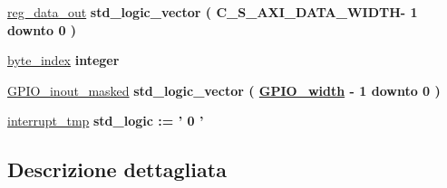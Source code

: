 \begin{DoxyCompactItemize}
\item 
\hypertarget{group___a_x_i-internal_gaa3772389d05ea4ed4ef3659c59ecc979}{\hyperlink{group___a_x_i-internal_gaa3772389d05ea4ed4ef3659c59ecc979}{reg\+\_\+data\+\_\+out} {\bfseries \textcolor{vhdlchar}{std\+\_\+logic\+\_\+vector}\textcolor{vhdlchar}{ }\textcolor{vhdlchar}{(}\textcolor{vhdlchar}{ }\textcolor{vhdlchar}{ }\textcolor{vhdlchar}{ }\textcolor{vhdlchar}{ }\textcolor{vhdlchar}{C\+\_\+\+S\+\_\+\+A\+X\+I\+\_\+\+D\+A\+T\+A\+\_\+\+W\+I\+D\+T\+H}\textcolor{vhdlchar}{-\/}\textcolor{vhdlchar}{ } \textcolor{vhdldigit}{1} \textcolor{vhdlchar}{ }\textcolor{vhdlchar}{downto}\textcolor{vhdlchar}{ }\textcolor{vhdlchar}{ } \textcolor{vhdldigit}{0} \textcolor{vhdlchar}{ }\textcolor{vhdlchar}{)}\textcolor{vhdlchar}{ }} }\label{group___a_x_i-internal_gaa3772389d05ea4ed4ef3659c59ecc979}

\item 
\hypertarget{group___a_x_i-internal_gac6ee69e440f203370b48953fe931a36c}{\hyperlink{group___a_x_i-internal_gac6ee69e440f203370b48953fe931a36c}{byte\+\_\+index} {\bfseries \textcolor{vhdlchar}{integer}\textcolor{vhdlchar}{ }} }\label{group___a_x_i-internal_gac6ee69e440f203370b48953fe931a36c}

\item 
\hypertarget{group___a_x_i-internal_ga83042d2ece1f3e1a3258d16a516201c1}{\hyperlink{group___a_x_i-internal_ga83042d2ece1f3e1a3258d16a516201c1}{G\+P\+I\+O\+\_\+inout\+\_\+masked} {\bfseries \textcolor{vhdlchar}{std\+\_\+logic\+\_\+vector}\textcolor{vhdlchar}{ }\textcolor{vhdlchar}{(}\textcolor{vhdlchar}{ }\textcolor{vhdlchar}{ }\textcolor{vhdlchar}{ }\textcolor{vhdlchar}{ }{\bfseries \hyperlink{group___a_x_i-internal_ga0b52ca75e9a6093b2b60d5e851803069}{G\+P\+I\+O\+\_\+width}} \textcolor{vhdlchar}{-\/}\textcolor{vhdlchar}{ } \textcolor{vhdldigit}{1} \textcolor{vhdlchar}{ }\textcolor{vhdlchar}{downto}\textcolor{vhdlchar}{ }\textcolor{vhdlchar}{ } \textcolor{vhdldigit}{0} \textcolor{vhdlchar}{ }\textcolor{vhdlchar}{)}\textcolor{vhdlchar}{ }} }\label{group___a_x_i-internal_ga83042d2ece1f3e1a3258d16a516201c1}

\item 
\hypertarget{group___a_x_i-internal_gad7f656c91324519f1ad5d25d903037b1}{\hyperlink{group___a_x_i-internal_gad7f656c91324519f1ad5d25d903037b1}{interrupt\+\_\+tmp} {\bfseries \textcolor{vhdlchar}{std\+\_\+logic}\textcolor{vhdlchar}{ }\textcolor{vhdlchar}{ }\textcolor{vhdlchar}{\+:}\textcolor{vhdlchar}{=}\textcolor{vhdlchar}{ }\textcolor{vhdlchar}{ }\textcolor{vhdlchar}{'}\textcolor{vhdlchar}{ } \textcolor{vhdldigit}{0} \textcolor{vhdlchar}{ }\textcolor{vhdlchar}{'}\textcolor{vhdlchar}{ }} }\label{group___a_x_i-internal_gad7f656c91324519f1ad5d25d903037b1}

\end{DoxyCompactItemize}


\subsection{Descrizione dettagliata}
